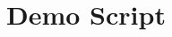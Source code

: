 \newpage
\appendix


\section {Demo Script}\label{demo}



\newpage
\addtocounter{page}{5}
\nocite{*}





{\footnotesize\begin{verbatim}
\end{verbatim}}

